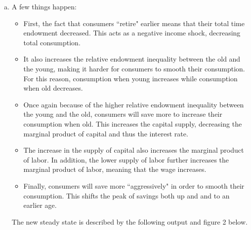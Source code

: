 \documentclass[letterpaper,12pt]{article}
\theoremstyle{definition}
\begin{document}
\begin{enumerate}
\begin{enumerate}[(a)]
	
	\item A few things happen:
	\begin{itemize}
	\item First, the fact that consumers ``retire" earlier means that their total time endowment decreased. This acts as a negative income shock, decreasing total consumption.
	\item It also increases the relative endowment inequality between the old and the young, making it harder for consumers to smooth their consumption. For this reason, consumption when young increases while consumption when old decreases.
	\item Once again because of the higher relative endowment inequality between the young and the old, consumers will save more to increase their consumption when old. This increases the capital supply, decreasing the marginal product of capital and thus the interest rate.
	\item The increase in the supply of capital also increases the marginal product of labor. In addition, the lower supply of labor further increases the marginal product of labor, meaning that the wage increases.
	\item Finally, consumers will save more ``aggressively" in order to smooth their consumption. This shifts the peak of savings both up and and to an earlier age. 
	\end{itemize}
The new steady state is described by the following output and figure 2 below.


\end{enumerate}
\end{enumerate}
\end{document}
